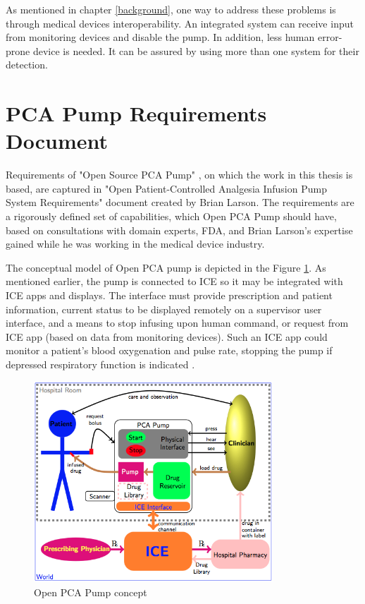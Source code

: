 As mentioned in chapter \ref{background}, one way to address these problems is through medical devices interoperability. An integrated system can receive input from monitoring devices and disable the pump. In addition, less human error-prone device is needed. It can be assured by using more than one system for their detection.



\section{PCA Pump Requirements Document}
\label{pcapump:requirements-doc}

Requirements of "Open Source PCA Pump" \cite{OpenSourcePCAPump:Paper}, on which the work in this thesis is based, are captured in "Open Patient-Controlled Analgesia Infusion Pump System Requirements" document \cite{PcaReq} created by Brian Larson. The requirements are a rigorously defined set of capabilities, which Open PCA Pump should have, based on consultations with domain experts, FDA, and Brian Larson's expertise gained while he was working in the medical device industry.

The conceptual model of Open PCA pump is depicted in the Figure \ref{figure:ice-pca-pump}. As mentioned earlier, the pump is connected to ICE so it may be integrated with ICE apps and displays. The interface must provide prescription and patient information, current status to be displayed remotely on a supervisor user interface, and a means to stop infusing upon human command, or request from ICE app (based on data from monitoring devices). Such an ICE app could monitor a patient's blood oxygenation and pulse rate, stopping the pump if depressed respiratory function is indicated \cite{PcaReq}.

\begin{figure}[ht]%
    \begin{center}
      \includegraphics[width=0.8\textwidth]{figures/ice-pca-pump.png}      
    \end{center}
    \caption{Open PCA Pump concept}
    \label{figure:ice-pca-pump}
\end{figure}


